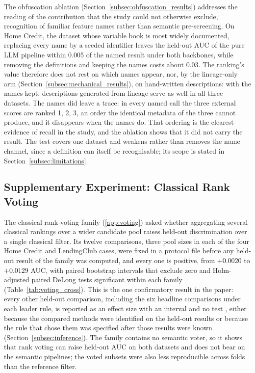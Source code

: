 \documentclass[final,5p,twocolumn]{elsarticle}
\providecommand{\DIFdeltex}[1]{{\protect\color{red} \scriptsize #1}} %
\providecommand{\DIFdelbegin}{} %
\providecommand{\DIFdelend}{} %
\providecommand{\DIFdel}[1]{\texorpdfstring{\DIFdeltex{#1}}{}} %
\begin{document}
The obfuscation ablation (Section~\ref{subsec:obfuscation_results}) addresses the reading of the contribution that the study could not otherwise exclude, recognition of familiar feature names rather than semantic pre-screening. On Home Credit, the dataset whose variable book is most widely documented, replacing every name by a seeded identifier leaves the held-out AUC of the pure LLM pipeline within 0.005 of the named result under both backbones, while removing the definitions and keeping the names costs about 0.03. The ranking's value therefore does not rest on which names appear, nor, by the lineage-only arm (Section~\ref{subsec:mechanical_results}), on hand-written descriptions: with the names kept, descriptions generated from lineage serve as well in all three datasets. The names did leave a trace: in every named call the three external scores are ranked 1, 2, 3, an order the identical metadata of the three cannot produce, and it disappears when the names do. That ordering is the clearest evidence of recall in the study, and the ablation shows that it did not carry the result. The test covers one dataset and weakens rather than removes the name channel, since a definition can itself be recognisable; its scope is stated in Section~\ref{subsec:limitations}.

\subsection{Supplementary Experiment: Classical Rank Voting}
\label{subsec:supplementary_discussion}

The classical rank-voting family (\ref{app:voting}) asked whether aggregating several classical rankings over a wider candidate pool raises held-out discrimination over a single classical filter. Its twelve comparisons, three pool sizes in each of the four Home Credit and LendingClub cases, were fixed in a protocol file before any held-out result of the family was computed, and every one is positive, from $+0.0020$ to $+0.0129$ AUC, with paired bootstrap intervals that exclude zero and Holm-adjusted paired DeLong tests significant within each family (Table~\ref{tab:voting_cross}). This is the one confirmatory result in the paper: every other held-out comparison, including the six headline comparisons under each leader rule, is reported as an effect size with an interval and no test \DIFdelbegin \DIFdel{, either because the compared methods were identified on the held-out results or because the rule that chose them was specified after those results were known }\DIFdelend (Section~\ref{subsec:inference}). The family contains no semantic voter, so it shows that rank voting can raise held-out AUC on both datasets and does not bear on the semantic pipelines; the voted subsets were also less reproducible across folds than the reference filter.
\end{document}
